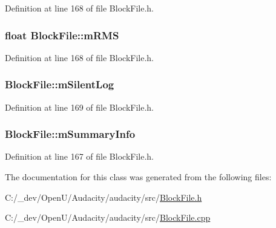 Definition at line 168 of file Block\+File.\+h.

\subsubsection[{\texorpdfstring{m\+R\+MS}{mRMS}}]{\setlength{\rightskip}{0pt plus 5cm}float Block\+File\+::m\+R\+MS\hspace{0.3cm}{\ttfamily [protected]}}\hypertarget{class_block_file_a9b863f624b2d76a5ec29390cebed698f}{}\label{class_block_file_a9b863f624b2d76a5ec29390cebed698f}


Definition at line 168 of file Block\+File.\+h.

\subsubsection[{\texorpdfstring{m\+Silent\+Log}{mSilentLog}}]{ Block\+File\+::m\+Silent\+Log\hspace{0.3cm}{\ttfamily [protected]}}\hypertarget{class_block_file_a670ed2ad2e13a94e3fb7c2ae32785811}{}\label{class_block_file_a670ed2ad2e13a94e3fb7c2ae32785811}


Definition at line 169 of file Block\+File.\+h.

\subsubsection[{\texorpdfstring{m\+Summary\+Info}{mSummaryInfo}}]{ Block\+File\+::m\+Summary\+Info\hspace{0.3cm}{\ttfamily [protected]}}\hypertarget{class_block_file_a4c81c30a570684d5287ed58acd3da259}{}\label{class_block_file_a4c81c30a570684d5287ed58acd3da259}


Definition at line 167 of file Block\+File.\+h.



The documentation for this class was generated from the following files\+:\begin{DoxyCompactItemize}
\item 
C\+:/\+\_\+dev/\+Open\+U/\+Audacity/audacity/src/\hyperlink{_block_file_8h}{Block\+File.\+h}\item 
C\+:/\+\_\+dev/\+Open\+U/\+Audacity/audacity/src/\hyperlink{_block_file_8cpp}{Block\+File.\+cpp}\end{DoxyCompactItemize}
